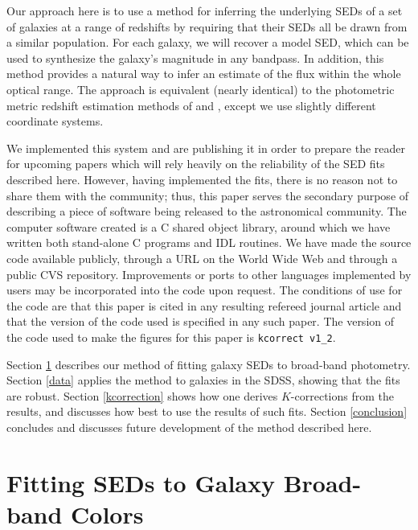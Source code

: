 \documentclass[10pt,preprint]{aastex}
\begin{document}
Our approach here is to use a method for inferring the underlying SEDs
of a set of galaxies at a range of redshifts by requiring that their
SEDs all be drawn from a similar population. For each galaxy, we will
recover a model SED, which can be used to synthesize the galaxy's
magnitude in any bandpass. In addition, this method provides a natural
way to infer an estimate of the flux within the whole optical range.
The approach is equivalent (nearly identical) to the photometric
metric redshift estimation methods of \citet{csabai99a} and
\citet{budavari00a}, except we use slightly different coordinate
systems.

We implemented this system and are publishing it in order to prepare
the reader for upcoming papers which will rely heavily on the
reliability of the SED fits described here.  However, having
implemented the fits, there is no reason not to share them with the
community; thus, this paper serves the secondary purpose of describing
a piece of software being released to the astronomical community. The
computer software created is a C shared object library, around which
we have written both stand-alone C programs and IDL routines. We have
made the source code available publicly, through a URL on the World
Wide Web and through a public CVS repository. Improvements or ports to
other languages implemented by users may be incorporated into the code
upon request. The conditions of use for the code are that this paper
is cited in any resulting refereed journal article and that the
version of the code used is specified in any such paper. The version
of the code used to make the figures for this paper is {\tt kcorrect
v1\_2}. 

Section \ref{sedfit} describes our method of fitting galaxy SEDs to
broad-band photometry. Section \ref{data} applies the method to
galaxies in the SDSS, showing that the fits are robust. Section
\ref{kcorrection} shows how one derives $K$-corrections from the
results, and discusses how best to use the results of such
fits. Section \ref{conclusion} concludes and discusses future
development of the method described here.

\section{Fitting SEDs to Galaxy Broad-band Colors}
\label{sedfit}
\end{document}
